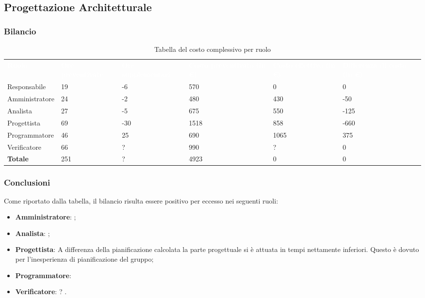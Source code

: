 \subsection{Progettazione Architetturale}
\subsubsection{Bilancio}

{
\renewcommand{\arraystretch}{2}
\begin{longtable}[h]{ C{2.5cm} C{2.5cm} C{2.5cm} C{2.5cm} C{1.5cm} C{2.5cm}}
\caption{Tabella del costo complessivo per ruolo}\\

\textcolor{white}{\textbf{Ruolo}} & 
\textcolor{white}{\textbf{Ore preventivate}} & 
\textcolor{white}{\textbf{Ore supplementari}} & 
\textcolor{white}{\textbf{Costo preventivato (in \euro{})}} & 
\textcolor{white}{\textbf{Costo effettivo (in \euro{})}} & 
\textcolor{white}{\textbf{Differenza di costo (in \euro{})}}\\	
	
Responsabile    & 19 & -6 & 570 & 0 & 0 \\
Amministratore  & 24 & -2 & 480 & 430 & -50 \\
Analista        & 27 & -5 & 675 & 550 & -125 \\
Progettista     & 69 & -30 & 1518 & 858 & -660 \\
Programmatore   & 46 & 25 & 690 & 1065 & 375 \\
Verificatore    & 66 & ? & 990 & ? & 0 \\
\textbf{Totale} & 251 & ? & 4923 & 0 & 0 \\	

\end{longtable}
}

\subsubsection{Conclusioni}
Come riportato dalla tabella, il bilancio risulta essere positivo per eccesso nei seguenti ruoli:
\begin{itemize}
	\item \textbf{Amministratore}: ;
	\item \textbf{Analista}: ;
	\item \textbf{Progettista}: A differenza della pianificazione calcolata la parte progettuale si è attuata in tempi nettamente inferiori. Questo è dovuto per l'inesperienza 
	di pianificazione del gruppo; 
	\item \textbf{Programmatore}: 
	\item \textbf{Verificatore}: ? .
\end{itemize}


